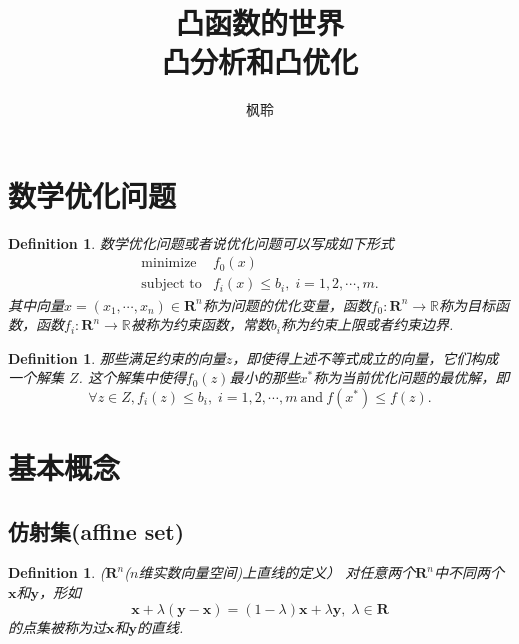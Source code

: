 \documentclass{article}
\newtheorem{definition}[theorem]{Definition}
\newcommand*{\xfunc}[4]{{#2}\colon{#3}{#1}{#4}}
\newcommand*{\func}[3]{\xfunc{\to}{#1}{#2}{#3}}
\newcommand{\thereal}{\mathbf{R}} %
\begin{document}
\title{凸函数的世界 \\ \small{{\color{red}凸分析}和{\color{red}凸优化}}}

\author{枫聆}
\maketitle
\tableofcontents

\newpage
\section{数学优化问题}

\begin{definition}
\rm {\color{red}数学优化}问题或者说{\color{red}优化问题}可以写成如下形式
$$
\begin{array}{ll}
\text{minimize} & f_0(x) \\
\text{subject to} & f_i(x) \leq b_i, \; i = 1,2,\cdots,m.
\end{array}
$$
其中向量$x = (x_1,\cdots,x_n) \in \mathbf{R}^n$称为问题的{\color{red}优化变量}，函数$\func{f_0}{\mathbf{R}^n}{\mathbb{R}}$称为{\color{red}目标函数}，函数$\func{f_i}{\mathbf{R}^n}{\mathbb{R}}$被称为{\color{red}约束函数}，常数$b_i$称为{\color{red}约束上限}或者{\color{red}约束边界}.
\end{definition}

\begin{definition}
\rm  那些满足约束的向量$z$，即使得上述不等式成立的向量，它们构成一个{\color{red}解集} $Z$. 这个解集中使得$f_0(z)$最小的那些$x^*$称为当前优化问题的{\color{red}最优解}，即
$$
\forall z \in Z, f_i(z) \leq b_i,\;i=1,2,\cdots,m~\text{and}~f(x^*) \leq f(z).
$$
\end{definition}

\newpage
\section{基本概念}

\subsection{仿射集(affine set)}

\begin{definition}
\rm {\color{red} ($\thereal^n$($n$维实数向量空间)上直线的定义）} 对任意两个$\thereal^n$中不同两个$\mathbf{x}$和$\mathbf{y}$，形如
$$
\mathbf{x} + \lambda(\mathbf{y}-\mathbf{x}) = (1-\lambda)\mathbf{x} + \lambda\mathbf{y},\; \lambda \in \thereal  
$$
的点集被称为过$\mathbf{x}$和$\mathbf{y}$的直线.
\end{definition}
\end{document}
